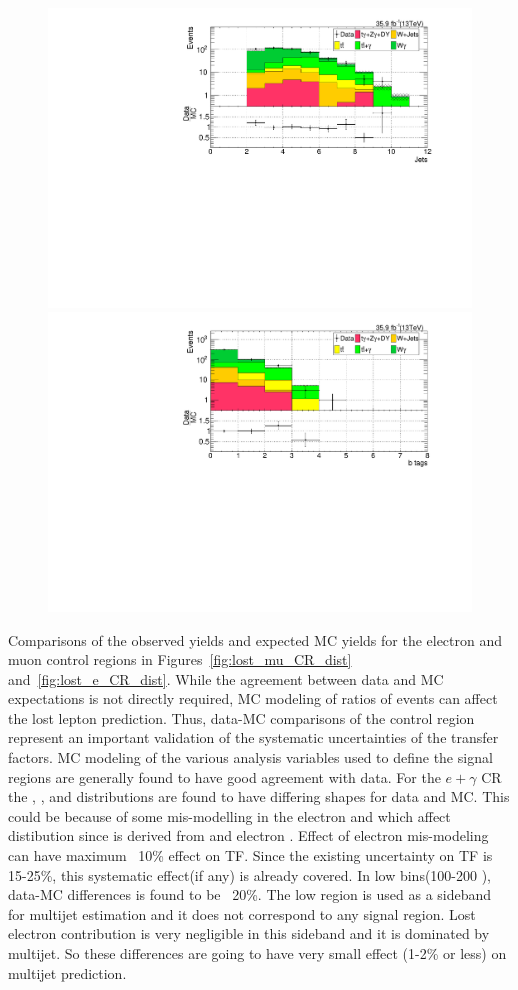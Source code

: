\begin{figure}[h!]
\includegraphics[width=0.48\linewidth]{../Figures/Chap3/lost_lepton/nHadJets_Mu1.pdf}
\includegraphics[width=0.48\linewidth]{../Figures/Chap3/lost_lepton/nBTags_Mu1.pdf}
\end{figure}

Comparisons of the observed yields and expected MC yields for the electron and muon control 
regions in Figures~\ref{fig:lost_mu_CR_dist} and~\ref{fig:lost_e_CR_dist}.  While the agreement between 
data and MC expectations is not directly required, MC modeling
of ratios of events can affect the lost lepton prediction.  Thus, data-MC comparisons of the
control region represent an important validation of the systematic uncertainties of the transfer
factors. 
MC modeling of the various analysis variables used to define the signal regions are generally 
found to have good agreement with data.  For the $e+\gamma$ CR the \pt, \ptmiss, and \mt
distributions are found to have differing shapes for data and MC. This could be because of some mis-modelling in the electron \pt and \ptmiss which affect \mt distibution since \mt is derived from \ptmiss and electron \pt. Effect of electron \pt mis-modeling can have maximum ~10\% effect on TF. Since the existing uncertainty on TF is 15-25\%, this systematic effect(if any) is already covered. In low \ptmiss bins(100-200 \gev), data-MC differences is found to be ~20\%. The low \ptmiss region is used as a sideband for multijet estimation and it does not correspond to any signal region. Lost electron contribution is very negligible in this sideband and it is dominated by multijet. So these differences are going to have very small effect (1-2\% or less) on multijet prediction.

